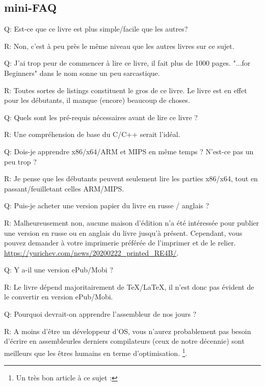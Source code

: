 \subsection*{mini-FAQ}

\par Q: Est-ce que ce livre est plus simple/facile que les autres?
\par R: Non, c'est à peu près le même niveau que les autres livres sur ce sujet.

\par Q: J'ai trop peur de commencer à lire ce livre, il fait plus de 1000 pages.
"...for Beginners" dans le nom sonne un peu sarcastique.
\par R: Toutes sortes de listings constituent le gros de ce livre.
Le livre est en effet pour les débutants, il manque (encore) beaucoup de choses.

\par Q: Quels sont les pré-requis nécessaires avant de lire ce livre ?
\par R: Une compréhension de base du C/C++ serait l'idéal.

\par Q: Dois-je apprendre x86/x64/ARM et MIPS en même temps ? N'est-ce pas un peu trop ?
\par R: Je pense que les débutants peuvent seulement lire les parties x86/x64, tout en passant/feuilletant celles ARM/MIPS.

\par Q: Puis-je acheter une version papier du livre en russe / anglais ?
\par R: Malheureusement non, aucune maison d'édition n'a été intéressée pour publier une version en russe ou en anglais du livre jusqu'à présent.
Cependant, vous pouvez demander à votre imprimerie préférée de l'imprimer et de le relier.
\url{https://yurichev.com/news/20200222_printed_RE4B/}.

\par Q: Y a-il une version ePub/Mobi ?
\par R: Le livre dépend majoritairement de TeX/LaTeX, il n'est donc pas évident de le convertir en version ePub/Mobi.

\par Q: Pourquoi devrait-on apprendre l'assembleur de nos jours ?
\par R: A moins d'être un développeur d'\ac{OS}, vous n'aurez probablement pas besoin d'écrire en assembleur\textemdash{}les derniers compilateurs (ceux de notre décennie) sont meilleurs que les êtres humains en terme d'optimisation. \footnote{Un très bon article à ce sujet : \InSqBrackets{\AgnerFog}}.

